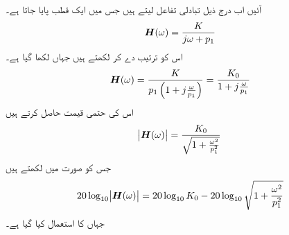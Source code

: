 آئیں اب درج ذیل تبادلی تفاعل لیتے ہیں جس میں ایک قطب پایا جاتا ہے۔
\begin{align}
{\ensuremath{{\boldsymbol{H}}}}(\omega)=\frac{K}{j\omega +p_1}
\end{align}
اس کو ترتیب دے کر لکھتے ہیں جہاں  لکھا گیا ہے۔
\begin{align}\label{مساوات_تعددی_ایک_قطب_الف}
{\ensuremath{{\boldsymbol{H}}}}(\omega)=\frac{K}{p_1\left(1+j\frac{\omega}{p_1}\right)}=\frac{K_0}{1+j\frac{\omega}{p_1}}
\end{align}
اس کی حتمی قیمت حاصل کرتے ہیں
\begin{align}
\abs{{{\boldsymbol{H}}}(\omega)}=\frac{K_0}{\sqrt{1+\frac{\omega^2}{p^2_1}}}
\end{align}
جس کو  صورت میں لکھتے ہیں
\begin{align}\label{مساوات_تعددی_ایک_قطب_ب}
20\log_{10}\abs{{{\boldsymbol{H}}}(\omega)}=20 \log_{10}K_0 -20\log_{10}\sqrt{1+\frac{\omega^2}{p^2_1}}
\end{align}
 جہاں  کا استعمال کیا گیا ہے۔


